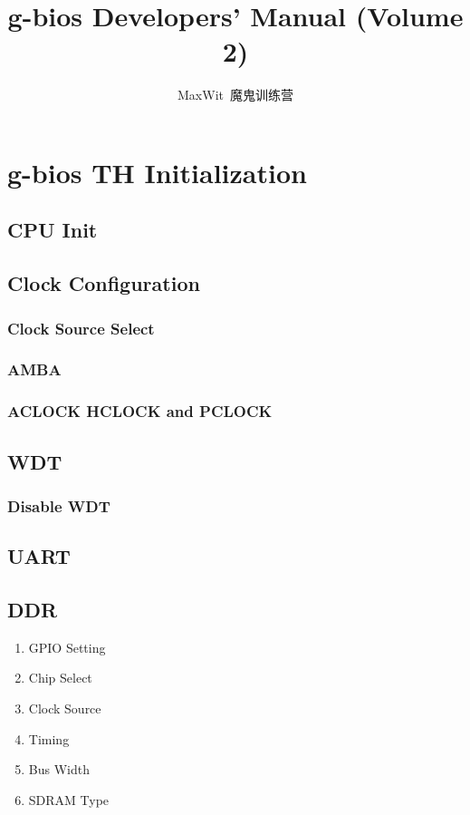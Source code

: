 \documentclass[a4paper,11pt]{book}
\title{g-bios Developers' Manual (Volume 2)}
\author{MaxWit~魔鬼训练营}
\begin{document}
\maketitle
\tableofcontents

\chapter{g-bios TH Initialization}

\section{CPU Init}

\section{Clock Configuration}
\subsection{Clock Source Select}
\subsection{AMBA}
\subsection{ACLOCK HCLOCK and PCLOCK}

\section{WDT}
\subsection{Disable WDT}

\section{UART}

\section{DDR}
\begin{enumerate}
\item GPIO Setting
\item Chip Select
\item Clock Source
\item Timing
\item Bus Width
\item SDRAM Type
\end{enumerate}
\end{document}
